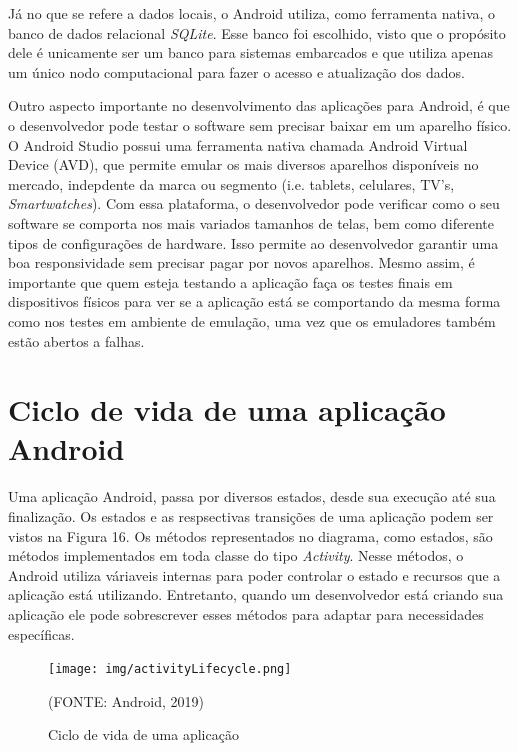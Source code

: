 \documentclass[
    12pt,       %
    openright,      %
    twoside,      %
    a4paper,      %
    english,      %
    french,       %
    spanish,      %
    brazil,       %
    ]{abntex2}
\begin{document}
        Já no que se refere a dados locais, o Android utiliza, como ferramenta nativa, o banco de
        dados relacional \textit{SQLite}. Esse banco foi escolhido, visto que o propósito dele é
        unicamente ser um banco para sistemas embarcados e que utiliza apenas um único nodo
        computacional para fazer o acesso e atualização dos dados.

        Outro aspecto importante no desenvolvimento das aplicações para Android, é que o
        desenvolvedor pode testar o software sem precisar baixar em um aparelho
        físico. O Android Studio possui uma ferramenta nativa chamada Android Virtual
        Device (AVD), que permite emular os mais diversos aparelhos disponíveis no
        mercado, indepdente da marca ou segmento (i.e. tablets, celulares, TV's,
        \textit{Smartwatches}). Com essa plataforma, o desenvolvedor pode verificar como o seu
        software se comporta nos mais variados tamanhos de telas, bem como diferente
        tipos de configurações de hardware. Isso permite ao desenvolvedor garantir
        uma boa responsividade sem precisar pagar por novos aparelhos. Mesmo assim,
        é importante que quem esteja testando a aplicação faça os testes finais em
        dispositivos físicos para ver se a aplicação está se comportando da mesma
        forma como nos testes em ambiente de emulação, uma vez que os emuladores
        também estão abertos a falhas.

      \section{Ciclo de vida de uma aplicação Android}
        Uma aplicação Android, passa por diversos estados, desde sua execução até sua finalização.
        Os estados e as respsectivas transições de uma aplicação podem ser vistos na Figura 16. Os
        métodos representados no diagrama, como estados, são métodos implementados em toda classe
        do tipo \textit{Activity}. Nesse métodos, o Android utiliza váriaveis internas para poder
        controlar o estado e recursos que a aplicação está utilizando. Entretanto, quando um
        desenvolvedor está criando sua aplicação ele pode sobrescrever esses métodos para adaptar
        para necessidades específicas.

        \begin{figure}[htbp]
            \begin{center}
                \texttt{[image: img/activityLifecycle.png]}
            \end{center}
        \caption{\label{fig:passaro} Ciclo de vida de uma aplicação}
        \begin{center}(FONTE: Android, 2019)\end{center}
        \end{figure}
\end{document}
